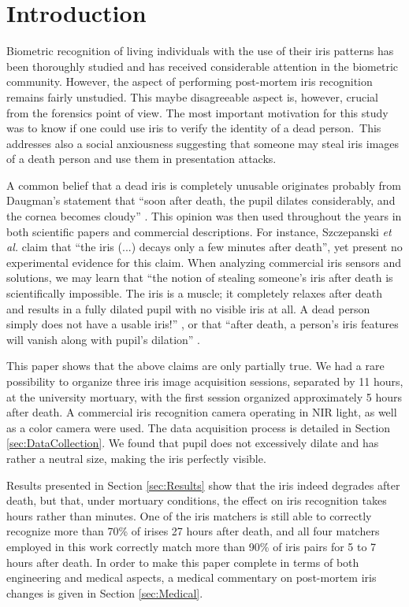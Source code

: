 \documentclass[10pt,twocolumn,letterpaper]{article}
\begin{document}
\section{Introduction}
Biometric recognition of living individuals with the use of their iris patterns has been thoroughly studied and has received considerable attention in the biometric community. However, the aspect of performing post-mortem iris recognition remains fairly unstudied. This maybe disagreeable aspect is, however, crucial from the forensics point of view. The most important motivation for this study was to know if one could use iris to verify the identity of a dead person. This addresses also a social anxiousness suggesting that someone may steal iris images of a death person and use them in presentation attacks.

A common belief that a dead iris is completely unusable originates probably from Daugman's statement that ``soon after death, the pupil dilates considerably, and the cornea becomes cloudy'' \cite{DaugmanPostMortem}. This opinion was then used throughout the years in both scientific papers and commercial descriptions. For instance, Szczepanski {\it et al.} \cite{SaeedPostMortem} claim that ``the iris (...) decays only a few minutes after death'', yet present no experimental evidence for this claim. When analyzing commercial iris sensors and solutions, we may learn that ``the notion of stealing someone's iris after death is scientifically impossible. The iris is a muscle; it completely relaxes after death and results in a fully dilated pupil with no visible iris at all. A dead person simply does not have a usable iris!'' \cite{IrisGuardPostMortem}, or that ``after death, a person's iris features will vanish along with pupil's dilation'' \cite{IriTechPostMortem}. 

This paper shows that the above claims are only partially true. We had a rare possibility to organize three iris image acquisition sessions, separated by 11 hours, at the university mortuary, with the first session organized approximately 5 hours after death. A commercial iris recognition camera operating in NIR light, as well as a color camera were used. The data acquisition process is detailed in Section \ref{sec:DataCollection}. We found that pupil does not excessively dilate and has rather a neutral size, making the iris perfectly visible. 

Results presented in Section \ref{sec:Results} show that the iris indeed degrades after death, but that, under mortuary conditions, the effect on iris recognition takes hours rather than minutes. One of the iris matchers is still able to correctly recognize more than 70\% of irises 27 hours after death, and all four matchers employed in this work correctly match more than 90\% of iris pairs for 5 to 7 hours after death. In order to make this paper complete in terms of both engineering and medical aspects, a medical commentary on post-mortem iris changes is given in Section \ref{sec:Medical}.
\end{document}
